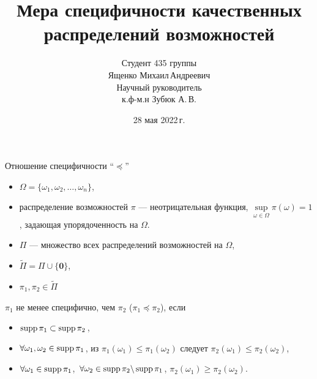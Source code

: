\documentclass[russian, unicode, mathserif, aspectratio=169]{beamer}
\title{Мера специфичности качественных распределений возможностей}
\author{Студент 435 группы\\ Ященко Михаил\,Андреевич\\Научный руководитель\\ к.ф-м.н Зубюк А.\,В.\\
}
\date{28 мая 2022\,г.}
\begin{document}
\sloppy

{
\maketitle
} 



\begin{frame}{Отношение специфичности ``$\preceq$''}
	
	\begin{itemize}
	    \item $\Omega = \{\omega_1, \omega_2, \ldots, \omega_n\}$,
	    \item распределение возможностей $\pi$ --- неотрицательная функция, $\underset{\omega \in \Omega}\sup\pi(\omega) = 1$, задающая упорядоченность на $\Omega$. 
	    \item $\Pi$ --- множество всех распределений возможностей на $\Omega$,
	    \item $\widetilde{\Pi} = \Pi \cup \{ \textbf{0} \}$,
	    \item $\pi_1, \pi_2 \in \widetilde{\Pi}$
	\end{itemize}
	\begin{definition}
	$\pi_1$ не менее специфично, чем $\pi_2$ ($\pi_1 \preceq \pi_2$), если
    \begin{itemize}
    \item $\operatorname{supp} \pi_1 \subset \operatorname{supp} \pi_2$,
    \item $\forall \omega_1, \omega_2 \in \operatorname{supp} \pi_1$, из $\pi_1(\omega_1) \leq \pi_1(\omega_2)$ следует $\pi_2(\omega_1) \leq \pi_2(\omega_2)$,
    \item $\forall \omega_1 \in \operatorname{supp} \pi_1$, $\forall \omega_2 \in \operatorname{supp} \pi_2 \backslash \operatorname{supp} \pi_1$, $\pi_2(\omega_1) \geq \pi_2(\omega_2)$.
    \end{itemize} 
	\end{definition}
	\justifying
	{\footnotesize
	}
\end{frame}
\end{document}
